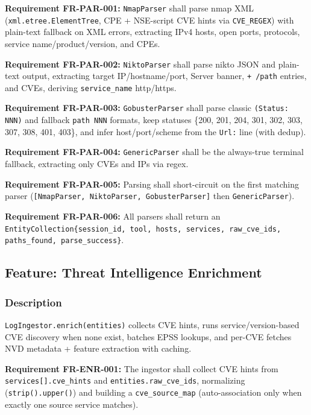 \documentclass[10pt,journal,onecolumn]{IEEEtran}
\newcommand{\reqid}[1]{\textbf{#1}}
\begin{document}
\reqid{Requirement FR-PAR-001:} \texttt{NmapParser} shall parse nmap XML (\texttt{xml.etree.ElementTree}, CPE + NSE-script CVE hints via \texttt{CVE\_REGEX}) with plain-text fallback on XML errors, extracting IPv4 hosts, open ports, protocols, service name/product/version, and CPEs.

\reqid{Requirement FR-PAR-002:} \texttt{NiktoParser} shall parse nikto JSON and plain-text output, extracting target IP/hostname/port, Server banner, \texttt{+ /path} entries, and CVEs, deriving \texttt{service\_name} http/https.

\reqid{Requirement FR-PAR-003:} \texttt{GobusterParser} shall parse classic \texttt{(Status: NNN)} and fallback \texttt{path NNN} formats, keep statuses \{200, 201, 204, 301, 302, 303, 307, 308, 401, 403\}, and infer host/port/scheme from the \texttt{Url:} line (with dedup).

\reqid{Requirement FR-PAR-004:} \texttt{GenericParser} shall be the always-true terminal fallback, extracting only CVEs and IPs via regex.

\reqid{Requirement FR-PAR-005:} Parsing shall short-circuit on the first matching parser (\texttt{[NmapParser, NiktoParser, GobusterParser]} then \texttt{GenericParser}).

\reqid{Requirement FR-PAR-006:} All parsers shall return an \texttt{EntityCollection\{session\_\allowbreak id, tool, hosts, services, raw\_\allowbreak cve\_\allowbreak ids, paths\_\allowbreak found, parse\_\allowbreak success\}}.

\subsection{Feature: Threat Intelligence Enrichment}

\subsubsection{Description}

\texttt{LogIngestor.\allowbreak enrich(entities)} collects CVE hints, runs service/version-based CVE discovery when none exist, batches EPSS lookups, and per-CVE fetches NVD metadata + feature extraction with caching.

\reqid{Requirement FR-ENR-001:} The ingestor shall collect CVE hints from \texttt{services[].cve\_hints} and \texttt{entities.raw\_cve\_ids}, normalizing (\texttt{strip().upper()}) and building a \texttt{cve\_source\_map} (auto-association only when exactly one source service matches).
\end{document}
